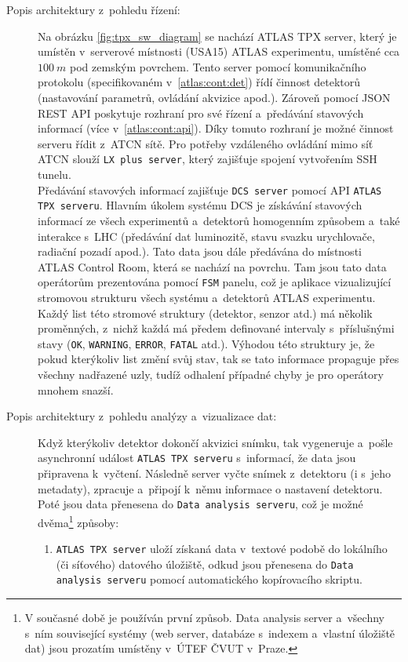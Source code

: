 \begin{description}
	\item[Popis architektury z~pohledu řízení:] 
		Na obrázku \ref{fig:tpx_sw_diagram} se nachází ATLAS TPX server, který je umístěn v~serverové místnosti (USA15) ATLAS experimentu, umístěné cca $100~m$ pod zemským povrchem. Tento server pomocí komunikačního protokolu (specifikovaném v~\ref{atlas:cont:det}) řídí činnost detektorů (nastavování parametrů, ovládání akvizice apod.). Zároveň pomocí JSON REST API poskytuje rozhraní pro své řízení a~předávání stavových informací (více v~\ref{atlas:cont:api}). Díky tomuto rozhraní je možné činnost serveru řídit z~ATCN sítě. Pro potřeby vzdáleného ovládání mimo síť ATCN slouží \texttt{LX plus server}, který zajišťuje spojení vytvořením SSH tunelu.\\
		Předávání stavových informací zajišťuje \texttt{DCS server} pomocí API \texttt{ATLAS TPX serveru}. Hlavním úkolem systému DCS je získávání stavových informací ze všech experimentů a~detektorů homogenním způsobem a~také interakce s~LHC (předávání dat luminozitě, stavu svazku urychlovače, radiační pozadí apod.). Tato data jsou dále předávána do místnosti ATLAS Control Room, která se nachází na povrchu. Tam jsou tato data operátorům prezentována pomocí \texttt{FSM} panelu, což je aplikace vizualizující stromovou strukturu všech systému a~detektorů ATLAS experimentu. Každý list této stromové struktury (detektor, senzor atd.) má několik proměnných, z~nichž každá má předem definované intervaly s~příslušnými stavy (\texttt{OK}, \texttt{WARNING}, \texttt{ERROR}, \texttt{FATAL} atd.). Výhodou této struktury je, že pokud kterýkoliv list změní svůj stav, tak se tato informace propaguje přes všechny nadřazené uzly, tudíž odhalení případné chyby je pro operátory mnohem snazší.
	\item[Popis architektury z~pohledu analýzy a~vizualizace dat:] 
		Když kterýkoliv detektor dokončí akvizici snímku, tak vygeneruje a~pošle asynchronní událost \texttt{ATLAS TPX serveru} s~informací, že data jsou připravena k~vyčtení. Následně server vyčte snímek z~detektoru (i s~jeho metadaty), zpracuje a~připojí k~němu informace o nastavení detektoru. Poté jsou data přenesena do \texttt{Data analysis serveru}, což je možné dvěma\footnote{V současné době je používán první způsob. Data analysis server a~všechny s~ním související systémy (web server, databáze s~indexem a~vlastní úložiště dat) jsou prozatím umístěny v~ÚTEF ČVUT v~Praze.} způsoby:
		\begin{enumerate}
			\item \texttt{ATLAS TPX server} uloží získaná data v~textové podobě do lokálního (či síťového) datového úložiště, odkud jsou přenesena do \texttt{Data analysis serveru} pomocí automatického kopírovacího skriptu.

\end{enumerate}
\end{description}
